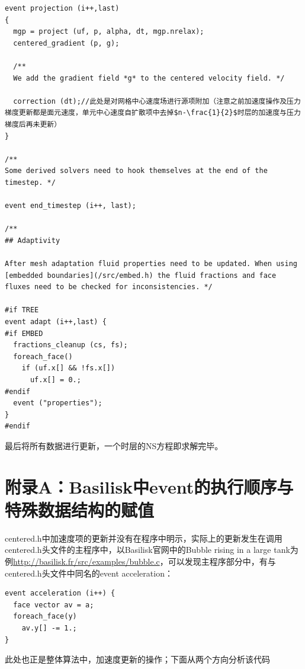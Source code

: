 \documentclass[lang=cn,11pt,a4paper]{elegantpaper}
\begin{document}
\begin{verbatim}
event projection (i++,last)
{
  mgp = project (uf, p, alpha, dt, mgp.nrelax);
  centered_gradient (p, g);

  /**
  We add the gradient field *g* to the centered velocity field. */

  correction (dt);//此处是对网格中心速度场进行源项附加（注意之前加速度操作及压力梯度更新都是面元速度，单元中心速度自扩散项中去掉$n-\frac{1}{2}$时层的加速度与压力梯度后再未更新）
}

/**
Some derived solvers need to hook themselves at the end of the
timestep. */

event end_timestep (i++, last);

/**
## Adaptivity

After mesh adaptation fluid properties need to be updated. When using
[embedded boundaries](/src/embed.h) the fluid fractions and face
fluxes need to be checked for inconsistencies. */

#if TREE
event adapt (i++,last) {
#if EMBED
  fractions_cleanup (cs, fs);
  foreach_face()
    if (uf.x[] && !fs.x[])
      uf.x[] = 0.;
#endif
  event ("properties");
}
#endif
\end{verbatim}
最后将所有数据进行更新，一个时层的NS方程即求解完毕。
\section{附录A：Basilisk中event的执行顺序与特殊数据结构的赋值}\label{sec:fuluA}

centered.h中加速度项的更新并没有在程序中明示，实际上的更新发生在调用centered.h头文件的主程序中，以Basilisk官网中的Bubble rising in a large tank为例\url{http://basilisk.fr/src/examples/bubble.c}，可以发现主程序部分中，有与centered.h头文件中同名的event acceleration：
\begin{verbatim}
event acceleration (i++) {
  face vector av = a;
  foreach_face(y)
    av.y[] -= 1.;
}
\end{verbatim}
此处也正是整体算法中，加速度更新的操作；下面从两个方向分析该代码
\end{document}
